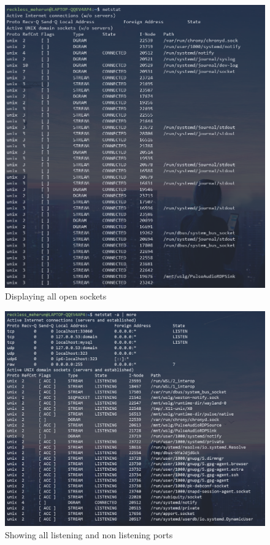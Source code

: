 \documentclass[11pt]{article}
\begin{document}
\begin{figure}[H]
	\centering
	\includegraphics[width=\textwidth]{res/netstat 1.png}
	\caption{Displaying all open sockets}
\end{figure}
\begin{figure}[H]
	\centering
	\includegraphics[width=\textwidth]{res/netstat 2.png}
	\caption{Showing all listening and non listening ports}
\end{figure}
\end{document}
